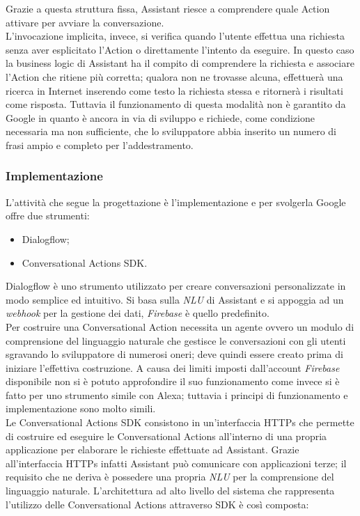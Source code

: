 		Grazie a questa struttura fissa, Assistant riesce a comprendere quale Action attivare per avviare la conversazione. \\
		L'invocazione implicita, invece, si verifica quando l'utente effettua una richiesta senza aver esplicitato l'Action o direttamente l'intento da eseguire. In questo caso la business logic di Assistant ha il compito di comprendere la richiesta e associare l'Action che ritiene più corretta; qualora non ne trovasse alcuna, effettuerà una ricerca in Internet inserendo come testo la richiesta stessa e ritornerà i risultati come risposta. Tuttavia il funzionamento di questa modalità non è garantito da Google in quanto è ancora in via di sviluppo e richiede, come condizione necessaria ma non sufficiente, che lo sviluppatore abbia inserito un numero di frasi ampio e completo per l'addestramento.
		\subsubsection{Implementazione}
		L'attività che segue la progettazione è l'implementazione e per svolgerla Google offre due strumenti:
		\begin{itemize}
			\item Dialogflow;
			\item Conversational Actions SDK.
		\end{itemize}
		Dialogflow è uno strumento utilizzato per creare conversazioni personalizzate in modo semplice ed intuitivo. Si basa sulla \textit{NLU} di Assistant e si appoggia ad un \textit{webhook} per la gestione dei dati, \textit{Firebase} è quello predefinito. \\
		Per costruire una Conversational Action necessita un agente ovvero un modulo di comprensione del linguaggio naturale che gestisce le conversazioni con gli utenti sgravando lo sviluppatore di numerosi oneri; deve quindi essere creato prima di iniziare l'effettiva costruzione. A causa dei limiti imposti dall'account \textit{Firebase} disponibile non si è potuto approfondire il suo funzionamento come invece si è fatto per uno strumento simile con Alexa; tuttavia i principi di funzionamento e implementazione sono molto simili. \\
		Le Conversational Actions SDK consistono in un'interfaccia HTTPs che permette di costruire ed eseguire le Conversational Actions all'interno di una propria applicazione per elaborare le richieste effettuate ad Assistant. Grazie all'interfaccia HTTPs infatti Assistant può comunicare con applicazioni terze; il requisito che ne deriva è possedere una propria \textit{NLU} per la comprensione del linguaggio naturale. L'architettura ad alto livello del sistema che rappresenta l'utilizzo delle Conversational Actions attraverso SDK è così composta:

